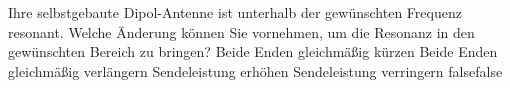     {Ihre selbstgebaute Dipol-Antenne ist unterhalb der gewünschten Frequenz resonant. Welche Änderung können Sie vornehmen, um die Resonanz in den gewünschten Bereich zu bringen?}
    {Beide Enden gleichmäßig kürzen}
    {Beide Enden gleichmäßig verlängern}
    {Sendeleistung erhöhen}
    {Sendeleistung verringern}
    {false}{false}